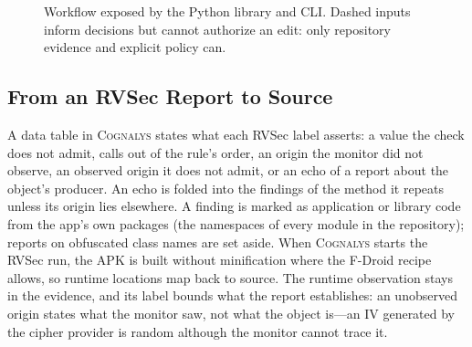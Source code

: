 \documentclass[conference]{IEEEtran}
\newcommand{\system}{\textsc{Cognalys}}
\begin{document}
\begin{figure}[t]
{
}
\caption{Workflow exposed by the Python library and CLI. Dashed inputs inform
decisions but cannot authorize an edit: only repository evidence and explicit
policy can.}
\label{fig:pipeline}
\end{figure}

\subsection{From an RVSec Report to Source}

A data table in \system{} states what each RVSec label asserts: a value the
check does not admit, calls out of the rule's order, an origin the monitor did
not observe, an observed origin it does not admit, or an echo of a report about
the object's producer. An echo is folded into the findings of the method it
repeats unless its origin lies elsewhere. A finding is marked as application or
library code from the app's own packages (the namespaces of every module in the
repository); reports on obfuscated class names are set aside. When \system{}
starts the RVSec run, the APK is built without minification where the F-Droid
recipe allows, so runtime locations map back to source. The runtime observation
stays in the evidence, and its label bounds what the report establishes: an
unobserved origin states what the monitor saw, not what the object is---an IV
generated by the cipher provider is random although the monitor cannot trace
it.
\end{document}
